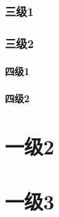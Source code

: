 \documentclass[a4paper]{article}
\begin{document}
\subsubsection{三级1}
\subsubsection{三级2}
\paragraph{四级1}
\paragraph{四级2}
\section{一级2}
\section{一级3}
\end{document}
